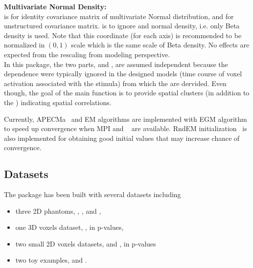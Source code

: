 {\bf Multivariate Normal Density:}\\
 is for identity covariance matrix of multivariate Normal
distribution, and  for unstructured covariance matrix.
 is to ignore  and normal density,
i.e. only Beta density is used.
Note that this coordinate (for each axis)
is recommended to be normalized in $(0, 1)$ scale
which is the same scale of Beta density. No effects are expected from the
rescaling  from modeling perspective.
\\

In this package, the two parts,
 and , are assumed independent because the
dependence were typically ignored in the designed models
(time course of voxel activation associated with the stimula)
from which the  are dervided.
Even though, the goal of the main function is to provide spatial
clusters (in addition to the ) indicating spatial correlations.

Currently, APECMa~\citep{Chen2011}
and EM algorithms are implemented with EGM algorithm~\citep{Chen2013}
to speed up convergence when MPI and ~\citep{Chen2012}
are available.
RndEM initialization~\citep{Maitra2009} is also implemented for obtaining
good initial values that may increase chance of convergence.


\subsection[Datasets]{Datasets}

The package has been built with several datasets including
\begin{itemize}
\item
three 2D phantoms, , , and ,
\item
one 3D voxels dataset, , in p-values,
\item 
two small 2D voxels datasets,  and ,
in p-values
\item
two toy examples,  and .
\end{itemize}


